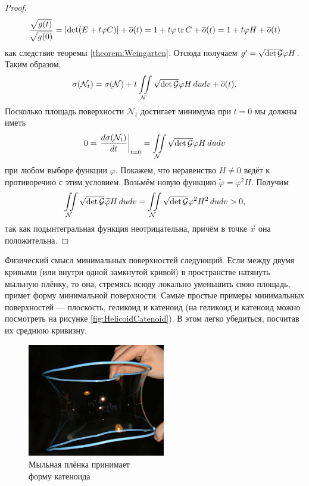 \begin{proof}
	\[
		\frac{\sqrt{g(t)}}{\sqrt{g(0)}} = \left\lvert\det(E + t\varphi C)\right\rvert + \overline{o}(t) = 1 + t\varphi\operatorname{tr} C + \overline{o}(t) = 1 + t\varphi H + \overline{o}(t)
	\]
	как следствие теоремы \ref{theorem:Weingarten}. Отсюда получаем $g^\prime = \sqrt{\det \mathcal{G}}\varphi H$. Таким образом,
	\[
		\sigma(\mathcal{N}_t) = \sigma(\mathcal{N}) + t\iint\limits_{\mathcal{N}}\sqrt{\det \mathcal{G}}\varphi H\,dudv + \overline{o}(t).
	\]
	Посколько площадь поверхности $\mathcal{N}_t$ достигает минимума при $t = 0$ мы должны иметь
	\[
		0 = \left.\frac{d\sigma(\mathcal{N}_t)}{dt}\right|_{t = 0} = \iint\limits_{\mathcal{N}}\sqrt{\det \mathcal{G}}\varphi H\,dudv
	\]
	при любом выборе функции $\varphi$. Покажем, что неравенство $H \ne 0$ ведёт к противоречию с этим условием. Возьмём новую функцию $\widetilde{\varphi} = \varphi^2H$. Получим
	\[
		\iint\limits_{\mathcal{N}}\sqrt{\det \mathcal{G}}\widetilde{\varphi}H\,dudv = \iint\limits_{\mathcal{N}}\sqrt{\det\mathcal{G}}\varphi^2H^2\,dudv > 0,
	\]
	так как подынтегральная функция неотрицательна, причём в точке $\vec{x}$ она положительна.
\end{proof}

Физический смысл минимальных поверхностей следующий. Если между двумя кривыми (или внутри одной замкнутой кривой) в пространстве натянуть мыльную плёнку, то она, стремясь всюду локально уменьшить свою площадь, примет форму минимальной поверхности. Самые простые примеры минимальных поверхностей --- плоскость, геликоид и катеноид (на геликоид и катеноид можно посмотреть на рисунке \ref{fig:HelicoidCatenoid}). В этом легко убедиться, посчитав их среднюю кривизну.

\begin{figure}[H]
	\centering
	\includegraphics[width=6cm]{./img/Membrane.png}
	\caption{Мыльная плёнка принимает\\ форму катеноида}
\end{figure}



